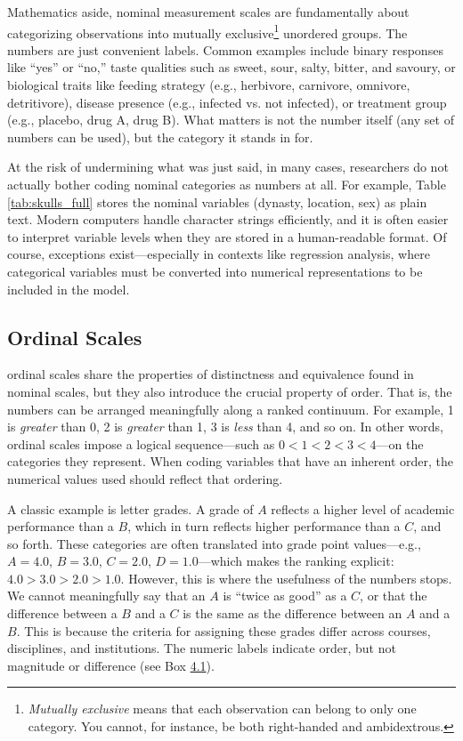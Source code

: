 Mathematics aside, nominal measurement scales are fundamentally about categorizing observations into mutually exclusive\footnote{\textit{Mutually exclusive} means that each observation can belong to only one category. You cannot, for instance, be both right-handed and ambidextrous.} unordered groups. The numbers are just convenient labels. Common examples include binary responses like ``yes'' or ``no,'' taste qualities such as sweet, sour, salty, bitter, and savoury, or biological traits like feeding strategy (e.g., herbivore, carnivore, omnivore, detritivore), disease presence (e.g., infected vs. not infected), or treatment group (e.g., placebo, drug A, drug B). What matters is not the number itself (any set of numbers can be used), but the category it stands in for. 

At the risk of undermining what was just said, in many cases, researchers do not actually bother coding nominal categories as numbers at all. For example, Table \ref{tab:skulls_full} stores the nominal variables (dynasty, location, sex) as plain text. Modern computers handle character strings efficiently, and it is often easier to interpret variable levels when they are stored in a human-readable format. Of course, exceptions exist—especially in contexts like regression analysis, where categorical variables must be converted into numerical representations to be included in the model.

\subsection{Ordinal Scales}
\label{sec:ordinal}

\Glspl{ordinal scale} share the properties of distinctness and equivalence found in nominal scales, but they also introduce the crucial property of order. That is, the numbers can be arranged meaningfully along a ranked continuum. For example,  1 is \textit{greater} than 0, 2 is \textit{greater} than 1, 3 is \textit{less} than 4, and so on. In other words, ordinal scales impose a logical sequence—such as $0 < 1 < 2 < 3 < 4$—on the categories they represent. When coding variables that have an inherent order, the numerical values used should reflect that ordering.

A classic example is letter grades. A grade of $A$ reflects a higher level of academic performance than a $B$, which in turn reflects higher performance than a $C$, and so forth. These categories are often translated into grade point values—e.g., $A = 4.0$, $B = 3.0$, $C = 2.0$, $D = 1.0$—which makes the ranking explicit: $4.0 > 3.0 > 2.0 > 1.0$. However, this is where the usefulness of the numbers stops. We cannot meaningfully say that an $A$ is ``twice as good'' as a $C$, or that the difference between a $B$ and a $C$ is the same as the difference between an $A$ and a $B$. This is because the criteria for assigning these grades differ across courses, disciplines, and institutions. The numeric labels indicate order, but not magnitude or difference (see Box \hyperlink{box:gpa_illusion}{4.1}).

